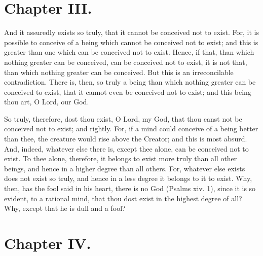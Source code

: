 \section{Chapter III.}

\begin{abstract}{h} God cannot be conceived not to ex\-ist.---God is
that, than which nothing greater can be con\-ceived.---That which can
be conceived not to exist is not God. \end{abstract}

\noindent And it assuredly exists so truly, that it cannot be
conceived not to exist. For, it is possible to conceive of a being
which cannot be conceived not to exist; and this is greater than one
which can be conceived not to exist. Hence, if that, than which
nothing greater can be conceived, can be conceived not to exist, it is
not that, than which nothing greater can be conceived. But this is an
irreconcilable contradiction. There is, then, so truly a being than
which nothing greater can be conceived to exist, that it cannot even
 be conceived not to exist; and this being thou art, O Lord,
our God.

So truly, therefore, dost thou exist, O Lord, my God, that thou canst
not be conceived not to exist; and rightly. For, if a mind could
conceive of a being better than thee, the creature would rise above
the Creator; and this is most absurd. And, indeed, whatever else there
is, except thee alone, can be conceived not to exist. To thee alone,
therefore, it belongs to exist more truly than all other beings, and
hence in a higher degree than all others. For, whatever else exists
does not exist so truly, and hence in a less degree it belongs to it
to exist. Why, then, has the fool said in his heart, there is no God
(Psalms xiv. 1), since it is so evident, to a rational mind, that thou
dost exist in the highest degree of all? Why, except that he is dull
and a fool?

\section{Chapter IV.}

\begin{abstract}{h} How the fool has said in his heart what cannot be
con\-ceived.---A thing may be conceived in two ways: (1) when the word
signifying it is conceived; (2) when the thing itself is understood
As far as the word goes, God can be conceived not to exist; in reality
he cannot. \end{abstract}

